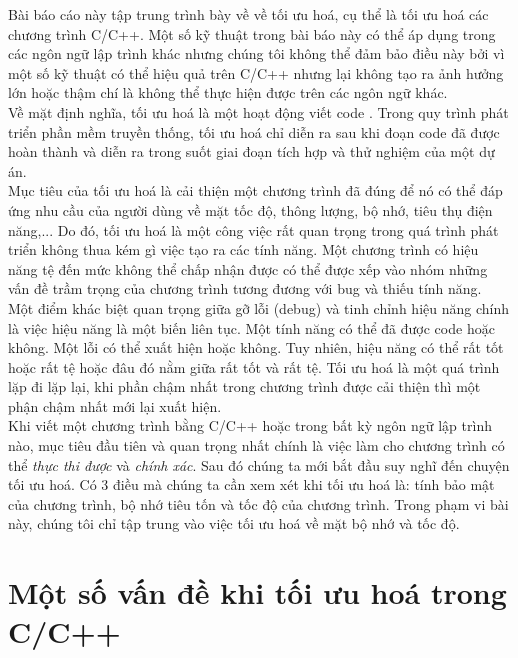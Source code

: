 \documentclass{article}
\begin{document}
\begin{flushleft} \justifying
Bài báo cáo này tập trung trình bày về về tối ưu hoá, cụ thể là tối ưu hoá các chương trình C/C++. Một số kỹ thuật trong bài báo này có thể áp dụng trong các ngôn ngữ lập trình khác nhưng chúng tôi không thể đảm bảo điều này bởi vì một số kỹ thuật có thể hiệu quả trên C/C++ nhưng lại không tạo ra ảnh hưởng lớn hoặc thậm chí là không thể thực hiện được trên các ngôn ngữ khác.\\

Về mặt định nghĩa, tối ưu hoá là một hoạt động viết code \cite{optimizedc++}. Trong quy trình phát triển phần mềm truyền thống, tối ưu hoá chỉ diễn ra sau khi đoạn code đã được hoàn thành và diễn ra trong suốt giai đoạn tích hợp và thử nghiệm của một dự án.\\ 

Mục tiêu của tối ưu hoá là cải thiện một chương trình đã đúng để nó có thể đáp ứng nhu cầu của người dùng về mặt tốc độ, thông lượng, bộ nhớ, tiêu thụ điện năng,... Do đó, tối ưu hoá là một công việc rất quan trọng trong quá trình phát triển không thua kém gì việc tạo ra các tính năng. Một chương trình có hiệu năng tệ đến mức không thể chấp nhận được có thể được xếp vào nhóm những vấn đề trầm trọng của chương trình tương đương với bug và thiếu tính năng.\\

Một điểm khác biệt quan trọng giữa gỡ lỗi (debug) và tinh chỉnh hiệu năng chính là việc hiệu năng là một biến liên tục. Một tính năng có thể đã được code hoặc không. Một lỗi có thể xuất hiện hoặc không. Tuy nhiên, hiệu năng có thể rất tốt hoặc rất tệ hoặc đâu đó nằm giữa rất tốt và rất tệ. Tối ưu hoá là một quá trình lặp đi lặp lại, khi phần chậm nhất trong chương trình được cải thiện thì một phận chậm nhất mới lại xuất hiện.\\

Khi viết một chương trình bằng C/C++ hoặc trong bất kỳ ngôn ngữ lập trình nào, mục tiêu đầu tiên và quan trọng nhất chính là việc làm cho chương trình có thể \textit{thực thi được} và \textit{chính xác}. Sau đó chúng ta mới bắt đầu suy nghĩ đến chuyện tối ưu hoá. Có 3 điều mà chúng ta cần xem xét khi tối ưu hoá là: tính bảo mật của chương trình, bộ nhớ tiêu tốn và tốc độ của chương trình. Trong phạm vi bài này, chúng tôi chỉ tập trung vào việc tối ưu hoá về mặt bộ nhớ và tốc độ.

\end{flushleft}
\section{Một số vấn đề khi tối ưu hoá trong C/C++}
\end{document}
